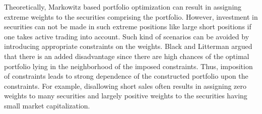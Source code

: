 \documentclass[12pt]{article}
\numberwithin{equation}{section}
\begin{document}
Theoretically, Markowitz based portfolio optimization can result in assigning extreme weights to the securities comprising the portfolio. However, investment in securities can not be made in such extreme positions like large short positions if one takes active trading into account. Such kind of scenarios can be avoided by introducing appropriate constraints on the weights.  Black and Litterman \cite{Black} argued that there is an added disadvantage since there are high chances of the optimal portfolio lying in the neighborhood of the imposed constraints. Thus, imposition of constraints leads to strong dependence of the constructed portfolio upon the constraints. For example, disallowing short sales often results in assigning zero weights to many securities and largely positive weights to the securities having small market capitalization. 
\end{document}
